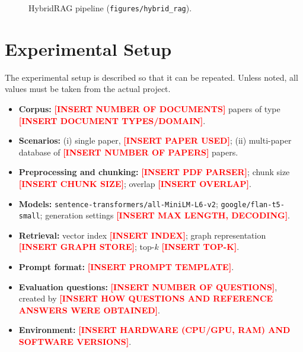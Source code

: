 \documentclass[conference]{IEEEtran}
\newcommand{\ph}[1]{\textbf{\textcolor{red}{[#1]}}}
\begin{document}
\begin{figure}[t]
\centering
{}
\caption{HybridRAG pipeline (\texttt{figures/hybrid\_rag}).}
\label{fig:hybrid}
\end{figure}

\section{Experimental Setup}
The experimental setup is described so that it can be repeated. Unless noted, all values must be taken from the actual project.
\begin{itemize}
\item \textbf{Corpus:} \ph{INSERT NUMBER OF DOCUMENTS} papers of type \ph{INSERT DOCUMENT TYPES/DOMAIN}.
\item \textbf{Scenarios:} (i) single paper, \ph{INSERT PAPER USED}; (ii) multi-paper database of \ph{INSERT NUMBER OF PAPERS} papers.
\item \textbf{Preprocessing and chunking:} \ph{INSERT PDF PARSER}; chunk size \ph{INSERT CHUNK SIZE}; overlap \ph{INSERT OVERLAP}.
\item \textbf{Models:} \texttt{sentence-transformers/all-MiniLM-L6-v2}; \texttt{google/flan-t5-small}; generation settings \ph{INSERT MAX LENGTH, DECODING}.
\item \textbf{Retrieval:} vector index \ph{INSERT INDEX}; graph representation \ph{INSERT GRAPH STORE}; top-$k$ \ph{INSERT TOP-K}.
\item \textbf{Prompt format:} \ph{INSERT PROMPT TEMPLATE}.
\item \textbf{Evaluation questions:} \ph{INSERT NUMBER OF QUESTIONS}, created by \ph{INSERT HOW QUESTIONS AND REFERENCE ANSWERS WERE OBTAINED}.
\item \textbf{Environment:} \ph{INSERT HARDWARE (CPU/GPU, RAM) AND SOFTWARE VERSIONS}.
\end{itemize}
\end{document}
